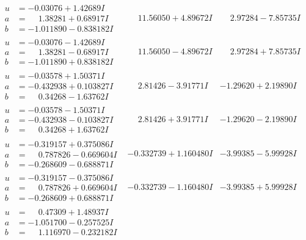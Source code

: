 \documentclass[1p]{elsarticle_modified}
\theoremstyle{definition}
\begin{document}
$$\begin{array}{c|c|c}
\begin{aligned}
u &= -0.03076 + 1.42689 I \\
a &= \phantom{-}1.38281 + 0.68917 I \\
b &= -1.011890 - 0.838182 I\end{aligned}
 & \phantom{-}11.56050 + 4.89672 I & \phantom{-}2.97284 - 7.85735 I \\ \hline\begin{aligned}
u &= -0.03076 - 1.42689 I \\
a &= \phantom{-}1.38281 - 0.68917 I \\
b &= -1.011890 + 0.838182 I\end{aligned}
 & \phantom{-}11.56050 - 4.89672 I & \phantom{-}2.97284 + 7.85735 I \\ \hline\begin{aligned}
u &= -0.03578 + 1.50371 I \\
a &= -0.432938 + 0.103827 I \\
b &= \phantom{-}0.34268 - 1.63762 I\end{aligned}
 & \phantom{-}2.81426 - 3.91771 I & -1.29620 + 2.19890 I \\ \hline\begin{aligned}
u &= -0.03578 - 1.50371 I \\
a &= -0.432938 - 0.103827 I \\
b &= \phantom{-}0.34268 + 1.63762 I\end{aligned}
 & \phantom{-}2.81426 + 3.91771 I & -1.29620 - 2.19890 I \\ \hline\begin{aligned}
u &= -0.319157 + 0.375086 I \\
a &= \phantom{-}0.787826 - 0.669604 I \\
b &= -0.268609 - 0.688871 I\end{aligned}
 & -0.332739 + 1.160480 I & -3.99385 - 5.99928 I \\ \hline\begin{aligned}
u &= -0.319157 - 0.375086 I \\
a &= \phantom{-}0.787826 + 0.669604 I \\
b &= -0.268609 + 0.688871 I\end{aligned}
 & -0.332739 - 1.160480 I & -3.99385 + 5.99928 I \\ \hline\begin{aligned}
u &= \phantom{-}0.47309 + 1.48937 I \\
a &= -1.051700 - 0.257525 I \\
b &= \phantom{-}1.116970 - 0.232182 I\end{aligned}

\end{array}$$
\end{document}
